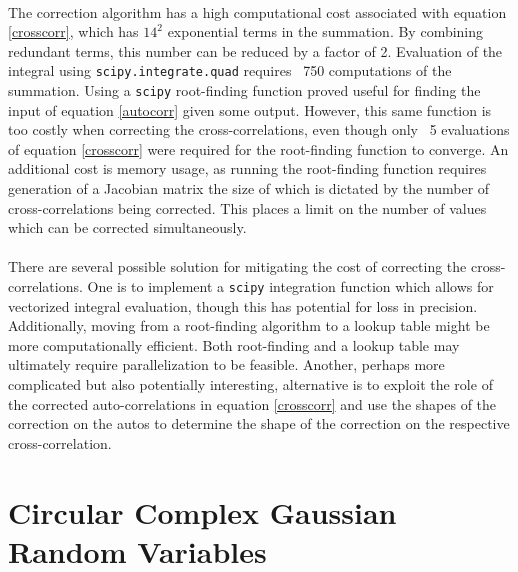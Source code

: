 \documentclass[11pt]{article}
\begin{document}
\paragraph{}The correction algorithm has a high computational cost associated with equation \ref{crosscorr}, which has $14^2$ exponential terms in the summation. By combining redundant terms, this number can be reduced by a factor of 2. Evaluation of the integral using \texttt{scipy.integrate.quad} requires ~750 computations of the summation. Using a \texttt{scipy} root-finding function proved useful for finding the input of equation \ref{autocorr} given some output. However, this same function is too costly when correcting the cross-correlations, even though only ~5 evaluations of equation \ref{crosscorr} were required for the root-finding function to converge. An additional cost is memory usage, as running the root-finding function requires generation of a Jacobian matrix the size of which is dictated by the number of cross-correlations being corrected. This places a limit on the number of values which can be corrected simultaneously. 
\paragraph{} 
There are several possible solution for mitigating the cost of correcting the cross-correlations. One is to implement a \texttt{scipy} integration function which allows for vectorized integral evaluation, though this has potential for loss in precision. Additionally, moving from a root-finding algorithm to a lookup table might be more computationally efficient. Both root-finding and a lookup table may ultimately require parallelization to be feasible. Another, perhaps more complicated but also potentially interesting, alternative is to exploit the role of the corrected auto-correlations in equation \ref{crosscorr} and use the shapes of the correction on the autos to determine the shape of the correction on the respective cross-correlation. 
\appendix
\section{Circular Complex Gaussian Random Variables}\label{ccrv}
\end{document}
